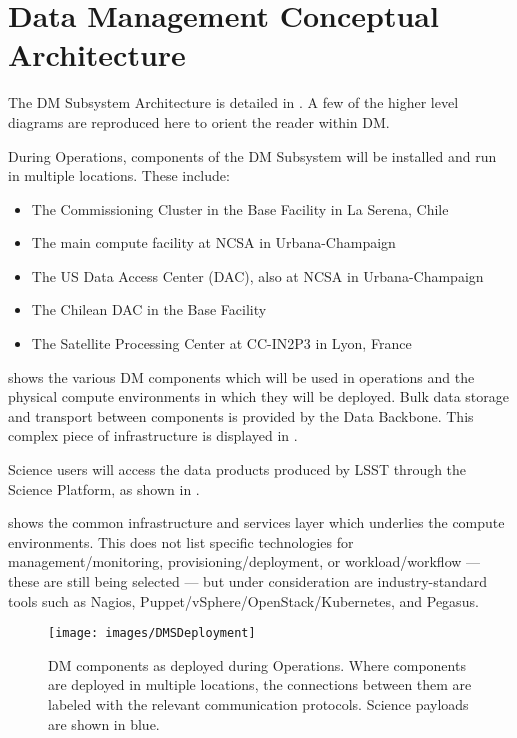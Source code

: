 \section{Data Management Conceptual Architecture \label{sect:dmarc}}

The DM Subsystem Architecture is detailed in .
A few of the higher level diagrams are reproduced here to orient the reader within DM.

During Operations, components of the DM Subsystem will be installed and run in
multiple locations. These include:

\begin{itemize}
\item The Commissioning Cluster in the Base Facility in La Serena, Chile
\item The main compute facility at NCSA in Urbana-Champaign
\item The US Data Access Center (DAC), also at NCSA in Urbana-Champaign
\item The Chilean DAC in the Base Facility
\item The Satellite Processing Center at CC-IN2P3 in Lyon, France
\end{itemize}

 shows the various DM components which will be used in operations and the physical compute environments in which they will be deployed.
Bulk data storage and transport between components is provided by the Data Backbone. This complex piece of infrastructure is displayed in .

Science users will access the data products produced by LSST through the
Science Platform, as shown in .

 shows the common infrastructure and services layer which underlies the compute environments.
This does not list specific technologies for management/monitoring, provisioning/deployment, or workload/workflow --- these are still being selected --- but under consideration are industry-standard tools such as Nagios, Puppet/vSphere/OpenStack/Kubernetes, and Pegasus.

\begin{figure}[htbp]
\begin{center}
\texttt{[image: images/DMSDeployment]}
\caption{DM components as deployed during Operations. Where components are
deployed in multiple locations, the connections between them are labeled with
the relevant communication protocols. Science payloads are shown in blue.
\label{fig:dmsdeploy}}
\end{center}
\end{figure}

